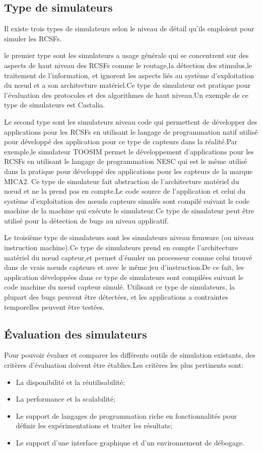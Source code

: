 \subsection{Type de simulateurs}
Il existe trois types de simulateurs selon le niveau de détail qu'ils emploient pour simuler les RCSFs.

le premier type sont les simulateurs a usage générale qui se concentrent sur des aspects de haut niveau des RCSFs comme le routage,la détection des stimulus,le traitement de l'information, et ignorent les aspects liés au système d'exploitation du nœud et a  son architecture matériel.Ce type de simulateur est pratique pour l'évaluation des protocoles et des algorithmes de haut niveau.Un exemple de ce type de simulateurs est Castalia.

Le second type sont les simulateurs niveau code qui permettent de développer des applications pour les RCSFs en utilisant le langage de programmation natif utilisé pour développé des application pour ce type de capteurs dans la réalité.Par exemple,le simulateur TOOSIM permet le développement d'applications pour les RCSFs en utilisant le langage de programmation NESC qui est le même utilisé dans la pratique pour développé des applications pour les capteurs de la marque MICA2.
Ce type de simulateur fait abstraction de l'architecture matériel du nœud et ne la prend pas en compte.Le code source de l'application et celui du système d'exploitation des nœuds capteurs simulés sont compilé suivant le code machine de la machine qui exécute le simulateur.Ce type de simulateur peut être utilisé pour la détection de bugs au niveau applicatif.

Le troisième type de simulateurs sont les simulateurs niveau firmware (ou niveau instruction machine).Ce type de simulateurs prend en compte l'architecture matériel du nœud capteur,et permet d'émuler un processeur comme celui trouvé dans de vrais nœuds capteurs et avec le même jeu d'instruction.De ce fait, les application développées dans ce type de simulateurs sont compilées suivant le code machine du nœud capteur simulé.
Utilisant ce type de simulateurs, la plupart des bugs peuvent être détectées, et les applications a contraintes temporelles peuvent être testées.

\subsection{Évaluation des simulateurs}
Pour pouvoir évaluer et comparer les différents outils de simulation existants, des critères d'évaluation doivent être établies.Les critères les plus pertinents sont:
\begin{itemize}
\item La disponibilité et la réutilisabilité;
\item La performance et la scalabilité;
\item Le support de langages de programmation riche en fonctionnalités pour définir les expérimentations et traiter les résultats;
\item Le support d'une interface graphique et d'un environnement de débogage.
\end{itemize}

